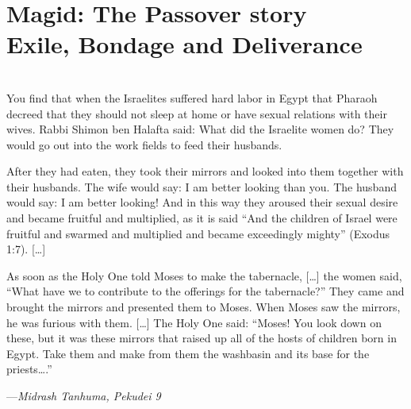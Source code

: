 \documentclass[letter,11pt,openany]{memoir}
\newcommand{\HgEllipsis}{\ensuremath{\left[\ldots\right]}}
\newcommand{\HgSource}[1]{\hfill{\small---\itshape{#1}}}
\newenvironment{HgEnglish}{\strut\\\noindent}{\vspace{1em}}
\begin{document}

%


\chapter*{Magid: The Passover story \\ {\LARGE Exile, Bondage and Deliverance}}

\begin{HgEnglish}
You find that when the Israelites suffered hard labor in Egypt that Pharaoh
decreed that they should not sleep at home or have sexual relations with their
wives. Rabbi Shimon ben Halafta said: What did the Israelite women do? 
They would 
go out into the work fields to feed their husbands. 
 
After they had eaten, they took their mirrors and looked into them together with
their husbands.  The wife would say: I am better looking than you. The husband
would say: I am better looking! And in this way they aroused their sexual desire
and became fruitful and multiplied, as it is said ``And the children of Israel
were fruitful and swarmed and multiplied and became exceedingly mighty'' (Exodus
1:7). [\ldots]
 

As soon as the Holy One told Moses to make the tabernacle, 
[\ldots]
the women said,
``What have we to contribute to the offerings for the tabernacle?'' They came and
brought the mirrors and presented them to Moses.  When Moses saw the mirrors, he
was furious with them. 
[\ldots]
The Holy One said: ``Moses! You look down on these, but it was these mirrors that
raised up all of the hosts of children born in Egypt. Take them and make from
them the washbasin and its base for the priests\ldots.''


\HgSource{Midrash Tanhuma, Pekudei 9}
\end{HgEnglish}
\end{document}

